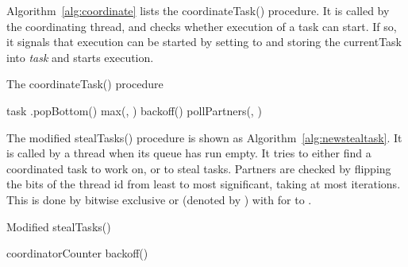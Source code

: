 \documentclass[preprint]{sigplanconf}
\begin{document}
Algorithm~\ref{alg:coordinate} lists the coordinateTask()
procedure.  It is called by the coordinating thread, and checks
whether execution of a task can start. If so, it signals that
execution can be started by setting  to  and storing the
currentTask into \emph{task} and starts execution.

\begin{algorithm}
\caption{The coordinateTask() procedure}\label{alg:coordinate}
\begin{algorithmic}[1]
\REPEAT
\STATE 
\IF {}
	\STATE {}
	\STATE 
	\STATE 
		\STATE {}
		\STATE 
		\STATE task  .popBottom()
		\STATE  max(, )
	\ELSE
		\STATE backoff()
	\ENDIF
\ELSE
	\STATE pollPartners(, )
\ENDIF
{}
\end{algorithmic}
\end{algorithm}

The modified stealTasks() procedure is shown as
Algorithm~\ref{alg:newstealtask}.  It is called by a thread when its
queue has run empty. It tries to either find a coordinated task to
work on, or to steal tasks.  Partners are checked by flipping the bits
of the thread id from least to most significant, taking at most  iterations. This is done by bitwise exclusive or (denoted by
) with  for  to .

\begin{algorithm}
\caption{Modified stealTasks()}\label{alg:newstealtask}
\begin{algorithmic}[1]
\STATE 
\WHILE { }
	\STATE  {}
	\STATE  {}
	\STATE  {}
		
		\STATE 
		\STATE  {}
			\STATE {}
			\STATE  {}
			\STATE coordinatorCounter  
			\RETURN
		\ENDIF
	\ELSE
	\STATE{}
		\STATE 
		\IF { } 
			\STATE {}
			\RETURN
		\ENDIF
		\STATE{}
		\STATE 
	\ENDIF
\ENDWHILE
\STATE {}
\STATE backoff()
\end{algorithmic}
\end{algorithm}
\end{document}
